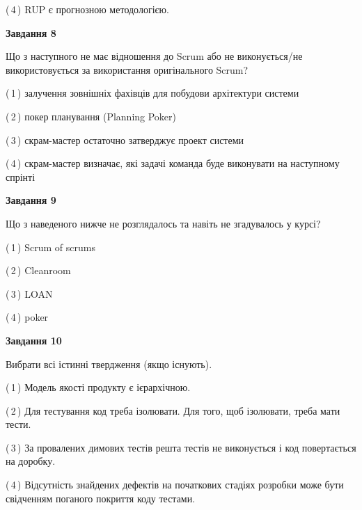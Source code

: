 \documentclass[10pt, ukrainian]{article}
\begin{document}
{\begin {large}
(\,4\,) RUP є прогнозною методологією. %


{\begin {center}\textbf{Завдання 8}\end {center}}\par
Що з наступного не має відношення до Scrum або не виконується/не використовується за використання оригінального Scrum?\par
\vspace{2mm}



(\,1\,) залучення зовнішніх фахівців для побудови архітектури системи%



(\,2\,) покер планування (Planning Poker)%



(\,3\,) скрам-мастер остаточно затверджує проект системи%



(\,4\,) скрам-мастер визначає, які задачі команда буде виконувати на наступному спрінті%


{\begin {center}\textbf{Завдання 9}\end {center}}\par
Що з наведеного нижче не розглядалось та навіть не згадувалось у курсі?\par
\vspace{2mm}



(\,1\,) Scrum of scrums%



(\,2\,) Cleanroom%



(\,3\,) LOAN%



(\,4\,) poker%


{\begin {center}\textbf{Завдання 10}\end {center}}\par
Вибрати всі істинні твердження (якщо існують).\par
\vspace{2mm}



(\,1\,) Модель якості продукту є ієрархічною.%



(\,2\,) Для тестування код треба ізолювати. Для того, щоб ізолювати, треба мати тести.%



(\,3\,) За провалених димових тестів решта тестів не виконується і код повертається на доробку.%



(\,4\,) Відсутність знайдених дефектів на початкових стадіях розробки може бути свідченням поганого покриття коду тестами.%



\end {large}}
\end{document}
